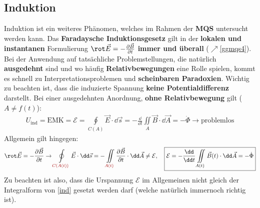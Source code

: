  \subsection{Induktion}\label{induktion}
		  Induktion ist ein weiteres Phänomen, welches im Rahmen der \textbf{MQS} untersucht werden kann. Das \textbf{Faradaysche Induktionsgesetz} gilt in der \textbf{lokalen und instantanen} Formulierung $\rot \vec{E} = -\frac{\partial \vec{B} }{\partial t}$ \textbf{immer und überall} ($\nearrow$\ref{ggmqs4}). Bei der Anwendung auf tatsächliche Problemstellungen, die natürlich \textbf{ausgedehnt} sind und wo häufig \textbf{Relativbewegungen} eine Rolle spielen, kommt es schnell zu Interpretationsproblemen und \textbf{scheinbaren Paradoxien}. Wichtig zu beachten ist, dass die induzierte Spannung \textbf{keine Potentialdifferenz} darstellt. Bei einer ausgedehnten Anordnung, \textbf{ohne Relativbewegung} gilt ($A\neq f(t)$):
			              \begin{equation}\begin{split}
					              U_\text{ind} = \text{EMK} = \mathcal{E}=\oint\limits_{C(A)} \vec{E}\cdot\dd\vec{s} = - \frac{\dd }{\dd t} \iint\limits_{A} \vec{B}  \cdot \dd \vec{A} = -\dot{\Phi} \to \text{problemlos}
				              \end{split}\end{equation}
			        Allgemein gilt hingegen:
			        \begin{equation} \rot \vec{E} = -\frac{\partial \vec{B} }{\partial t} \to \oint\limits_{\textcolor{red}{C(A(t))}} \vec{E}\cdot\dd\vec{s} = -\iint\limits_{\textcolor{red}{A(t)}} \frac{\partial \vec{B} }{\partial t} \cdot \dd \vec{A}\ne \mathcal{E},\quad \boxed{\mathcal{E}=- \frac{\dd }{\dd t} \iint\limits_{A(t)} \vec{B}(t)  \cdot \dd \vec{A}=-\dot{\Phi}}\end{equation}
		Zu beachten ist also, dass die Urspannung $\mathcal{E}$ im Allgemeinen nicht gleich der Integralform von \ref{ind} gesetzt werden darf (welche natürlich immernoch richtig ist).
